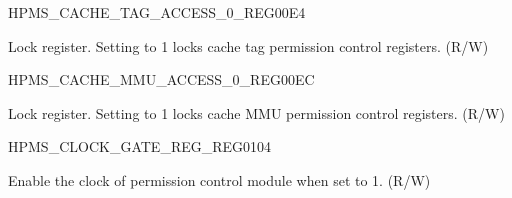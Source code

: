 \begin{register}{H}{PMS\_CACHE\_TAG\_ACCESS\_0\_REG}{\hexprefix{}00E4}\label{regdesc:PMSCACHETAGACCESS0REG}
%
%
\regnewline%
\begin{regdesc}\begin{reglist}
\label{fielddesc:PMSCACHETAGACCESSLOCK}\item [PMS\_CACHE\_TAG\_ACCESS\_LOCK] Lock register. Setting to 1 locks cache tag permission control registers. (R/W)
\end{reglist}\end{regdesc}
\end{register}


\begin{register}{H}{PMS\_CACHE\_MMU\_ACCESS\_0\_REG}{\hexprefix{}00EC}\label{regdesc:PMSCACHEMMUACCESS0REG}
%
%
\regnewline%
\begin{regdesc}\begin{reglist}
\label{fielddesc:PMSCACHEMMUACCESSLOCK}\item [PMS\_CACHE\_MMU\_ACCESS\_LOCK] Lock register. Setting to 1 locks cache MMU permission control registers. (R/W)
\end{reglist}\end{regdesc}
\end{register}


\begin{register}{H}{PMS\_CLOCK\_GATE\_REG\_REG}{\hexprefix{}0104}\label{regdesc:PMSCLOCKGATEREGREG}
%
%
\regnewline%
\begin{regdesc}\begin{reglist}
\label{fielddesc:PMSCLKEN}\item [PMS\_CLK\_EN] Enable the clock of permission control module when set to 1. (R/W)
\end{reglist}\end{regdesc}
\end{register}


